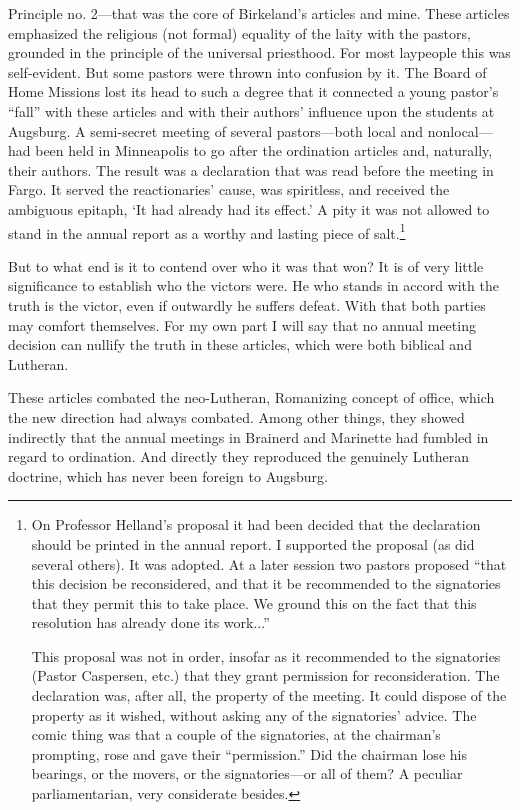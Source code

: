 Principle no. 2—that was the core of Birkeland’s articles and mine. These articles emphasized the religious (not formal) equality of the laity with the pastors, grounded in the principle of the universal priesthood. For most laypeople this was self-evident. But some pastors were thrown into confusion by it. The Board of Home Missions lost its head to such a degree that it connected a young pastor’s “fall” with these articles and with their authors’ influence upon the students at Augsburg. A semi-secret meeting of several pastors—both local and nonlocal—had been held in Minneapolis to go after the ordination articles and, naturally, their authors. The result was a declaration that was read before the meeting in Fargo. It served the reactionaries’ cause, was spiritless, and received the ambiguous epitaph, ‘It had already had its effect.’ A pity it was not allowed to stand in the annual report as a worthy and lasting piece of salt.\footnote{On Professor Helland’s proposal it had been decided that the declaration should be printed in the annual report. I supported the proposal (as did several others). It was adopted. At a later session two pastors proposed “that this decision be reconsidered, and that it be recommended to the signatories that they permit this to take place. We ground this on the fact that this resolution has already done its work...”

This proposal was not in order, insofar as it recommended to the signatories (Pastor Caspersen, etc.) that they grant permission for reconsideration. The declaration was, after all, the property of the meeting. It could dispose of the property as it wished, without asking any of the signatories’ advice. The comic thing was that a couple of the signatories, at the chairman’s prompting, rose and gave their “permission.” Did the chairman lose his bearings, or the movers, or the signatories—or all of them? A peculiar parliamentarian, very considerate besides.}

But to what end is it to contend over who it was that won? It is of very little significance to establish who the victors were. He who stands in accord with the truth is the victor, even if outwardly he suffers defeat. With that both parties may comfort themselves. For my own part I will say that no annual meeting decision can nullify the truth in these articles, which were both biblical and Lutheran.

These articles combated the neo-Lutheran, Romanizing concept of office, which the new direction had always combated. Among other things, they showed indirectly that the annual meetings in Brainerd and Marinette had fumbled in regard to ordination. And directly they reproduced the genuinely Lutheran doctrine, which has never been foreign to Augsburg.

